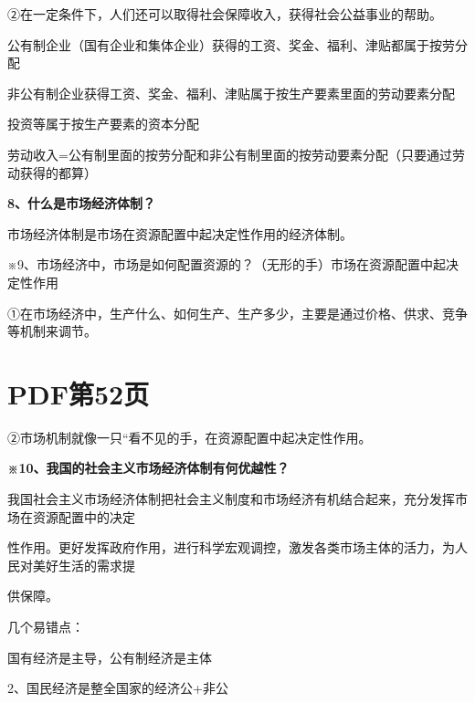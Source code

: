 \documentclass[lang=cn,11pt]{elegantbook}
\newcommand{\daofasym}[1]{{\daofasymbolfont #1}}
\newcommand{\daofasym}[1]{#1}
\begin{document}
\daofasym{②}在一定条件下，人们还可以取得社会保障收入，获得社会公益事业的帮助。\par

公有制企业（国有企业和集体企业）获得的工资、奖金、福利、津贴都属于按劳分配\par

非公有制企业获得工资、奖金、福利、津贴属于按生产要素里面的劳动要素分配\par

投资等属于按生产要素的资本分配\par

劳动收入=公有制里面的按劳分配和非公有制里面的按劳动要素分配（只要通过劳动获得的都算）\par

\textbf{8、什么是市场经济体制？}\par

市场经济体制是市场在资源配置中起决定性作用的经济体制。\par

※9、市场经济中，市场是如何配置资源的？（无形的手）市场在资源配置中起决定性作用\par

\daofasym{①}在市场经济中，生产什么、如何生产、生产多少，主要是通过价格、供求、竞争等机制来调节。\par


\section*{PDF第52页}

\daofasym{②}市场机制就像一只“看不见的手，在资源配置中起决定性作用。\par

\textbf{※10、我国的社会主义市场经济体制有何优越性？}\par

我国社会主义市场经济体制把社会主义制度和市场经济有机结合起来，充分发挥市场在资源配置中的决定\par

性作用。更好发挥政府作用，进行科学宏观调控，激发各类市场主体的活力，为人民对美好生活的需求提\par

供保障。\par

几个易错点：\par

国有经济是主导，公有制经济是主体\par

2、国民经济是整全国家的经济公+非公\par
\end{document}

